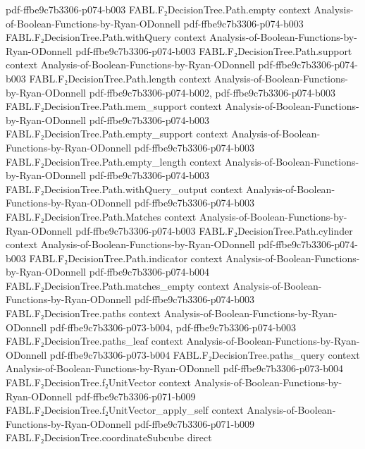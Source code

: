 \begin{theorem}
  {pdf-ffbe9c7b3306-p074-b003}
\proofstep
  {FABL.F₂DecisionTree.Path.empty}
  {context}
  {Analysis-of-Boolean-Functions-by-Ryan-ODonnell}
  {pdf-ffbe9c7b3306-p074-b003}
\proofstep
  {FABL.F₂DecisionTree.Path.withQuery}
  {context}
  {Analysis-of-Boolean-Functions-by-Ryan-ODonnell}
  {pdf-ffbe9c7b3306-p074-b003}
\proofstep
  {FABL.F₂DecisionTree.Path.support}
  {context}
  {Analysis-of-Boolean-Functions-by-Ryan-ODonnell}
  {pdf-ffbe9c7b3306-p074-b003}
\proofstep
  {FABL.F₂DecisionTree.Path.length}
  {context}
  {Analysis-of-Boolean-Functions-by-Ryan-ODonnell}
  {pdf-ffbe9c7b3306-p074-b002,
    pdf-ffbe9c7b3306-p074-b003}
\proofstep
  {FABL.F₂DecisionTree.Path.mem_support}
  {context}
  {Analysis-of-Boolean-Functions-by-Ryan-ODonnell}
  {pdf-ffbe9c7b3306-p074-b003}
\proofstep
  {FABL.F₂DecisionTree.Path.empty_support}
  {context}
  {Analysis-of-Boolean-Functions-by-Ryan-ODonnell}
  {pdf-ffbe9c7b3306-p074-b003}
\proofstep
  {FABL.F₂DecisionTree.Path.empty_length}
  {context}
  {Analysis-of-Boolean-Functions-by-Ryan-ODonnell}
  {pdf-ffbe9c7b3306-p074-b003}
\proofstep
  {FABL.F₂DecisionTree.Path.withQuery_output}
  {context}
  {Analysis-of-Boolean-Functions-by-Ryan-ODonnell}
  {pdf-ffbe9c7b3306-p074-b003}
\proofstep
  {FABL.F₂DecisionTree.Path.Matches}
  {context}
  {Analysis-of-Boolean-Functions-by-Ryan-ODonnell}
  {pdf-ffbe9c7b3306-p074-b003}
\proofstep
  {FABL.F₂DecisionTree.Path.cylinder}
  {context}
  {Analysis-of-Boolean-Functions-by-Ryan-ODonnell}
  {pdf-ffbe9c7b3306-p074-b003}
\proofstep
  {FABL.F₂DecisionTree.Path.indicator}
  {context}
  {Analysis-of-Boolean-Functions-by-Ryan-ODonnell}
  {pdf-ffbe9c7b3306-p074-b004}
\proofstep
  {FABL.F₂DecisionTree.Path.matches_empty}
  {context}
  {Analysis-of-Boolean-Functions-by-Ryan-ODonnell}
  {pdf-ffbe9c7b3306-p074-b003}
\proofstep
  {FABL.F₂DecisionTree.paths}
  {context}
  {Analysis-of-Boolean-Functions-by-Ryan-ODonnell}
  {pdf-ffbe9c7b3306-p073-b004,
    pdf-ffbe9c7b3306-p074-b003}
\proofstep
  {FABL.F₂DecisionTree.paths_leaf}
  {context}
  {Analysis-of-Boolean-Functions-by-Ryan-ODonnell}
  {pdf-ffbe9c7b3306-p073-b004}
\proofstep
  {FABL.F₂DecisionTree.paths_query}
  {context}
  {Analysis-of-Boolean-Functions-by-Ryan-ODonnell}
  {pdf-ffbe9c7b3306-p073-b004}
\proofstep
  {FABL.F₂DecisionTree.f₂UnitVector}
  {context}
  {Analysis-of-Boolean-Functions-by-Ryan-ODonnell}
  {pdf-ffbe9c7b3306-p071-b009}
\proofstep
  {FABL.F₂DecisionTree.f₂UnitVector_apply_self}
  {context}
  {Analysis-of-Boolean-Functions-by-Ryan-ODonnell}
  {pdf-ffbe9c7b3306-p071-b009}
\proofstep
  {FABL.F₂DecisionTree.coordinateSubcube}
  {direct}

\end{theorem}
